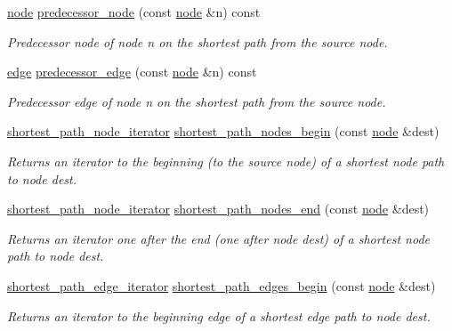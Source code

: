 \begin{DoxyCompactItemize}
\mbox{\hyperlink{classnode}{node}} \mbox{\hyperlink{classdijkstra_a99c17ee7c2b55574ea8c2952fac09faf}{predecessor\+\_\+node}} (const \mbox{\hyperlink{classnode}{node}} \&n) const
\begin{DoxyCompactList}\small\item\em Predecessor node of node {\ttfamily n} on the shortest path from the source node. \end{DoxyCompactList}\item 
\mbox{\hyperlink{classedge}{edge}} \mbox{\hyperlink{classdijkstra_aa3ef1a7d7dfc33e4a39aff309f873929}{predecessor\+\_\+edge}} (const \mbox{\hyperlink{classnode}{node}} \&n) const
\begin{DoxyCompactList}\small\item\em Predecessor edge of node {\ttfamily n} on the shortest path from the source node. \end{DoxyCompactList}\item 
\mbox{\hyperlink{classdijkstra_a2ba040b6e45343a2c3675788968d9113}{shortest\+\_\+path\+\_\+node\+\_\+iterator}} \mbox{\hyperlink{classdijkstra_ae30c66319d925387ed858aab9ce419ae}{shortest\+\_\+path\+\_\+nodes\+\_\+begin}} (const \mbox{\hyperlink{classnode}{node}} \&dest)
\begin{DoxyCompactList}\small\item\em Returns an iterator to the beginning (to the source node) of a shortest node path to node {\ttfamily dest}. \end{DoxyCompactList}\item 
\mbox{\hyperlink{classdijkstra_a2ba040b6e45343a2c3675788968d9113}{shortest\+\_\+path\+\_\+node\+\_\+iterator}} \mbox{\hyperlink{classdijkstra_ae9846beeabd53a8cf0c0c1af328235b2}{shortest\+\_\+path\+\_\+nodes\+\_\+end}} (const \mbox{\hyperlink{classnode}{node}} \&dest)
\begin{DoxyCompactList}\small\item\em Returns an iterator one after the end (one after node {\ttfamily dest}) of a shortest node path to node {\ttfamily dest}. \end{DoxyCompactList}\item 
\mbox{\hyperlink{classdijkstra_afb9a918f95b13aefcef331896fe3b41c}{shortest\+\_\+path\+\_\+edge\+\_\+iterator}} \mbox{\hyperlink{classdijkstra_ad7ef6f747b68f8951322b265844dbb8a}{shortest\+\_\+path\+\_\+edges\+\_\+begin}} (const \mbox{\hyperlink{classnode}{node}} \&dest)
\begin{DoxyCompactList}\small\item\em Returns an iterator to the beginning edge of a shortest edge path to node {\ttfamily dest}. \end{DoxyCompactList}\item 

\end{DoxyCompactItemize}
